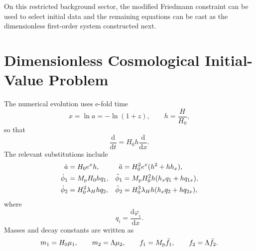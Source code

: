 \documentclass[aps,prd,twocolumn,superscriptaddress,nofootinbib,longbibliography]{revtex4-2}
\newcommand{\dd}{\mathrm{d}}
\newcommand{\Mp}{M_{\rm p}}
\newcommand{\Lam}{\Lambda}
\begin{document}
On this restricted background sector, the modified Friedmann constraint can be used to select initial data and the remaining equations can be cast as the dimensionless first-order system constructed next.

\section{Dimensionless Cosmological Initial-Value Problem}
\label{sec:ivp}

The numerical evolution uses e-fold time
\begin{equation}
x=\ln a=-\ln(1+z),
\qquad
h=\frac{H}{H_0},
\label{eq:xh}
\end{equation}
so that
\begin{equation}
\frac{\dd}{\dd t}=H_0h\frac{\dd}{\dd x}.
\label{eq:chain-rule}
\end{equation}
The relevant substitutions include
\begin{align}
\dot a&=H_0e^xh,
&
\ddot a&=H_0^2e^x(h^2+hh_x),\\
\dot\phi_1&=\Mp H_0h q_1,
&
\ddot\phi_1&=\Mp H_0^2h(h_xq_1+hq_{1x}),\\
\dot\phi_2&=H_0^2\lambda_H h q_2,
&
\ddot\phi_2&=H_0^3\lambda_H h(h_xq_2+hq_{2x}),
\label{eq:rescalings}
\end{align}
where
\begin{equation}
q_i=\frac{\dd\varphi_i}{\dd x}.
\end{equation}
Masses and decay constants are written as
\begin{equation}
m_1=H_0\mu_1,\qquad
m_2=\Lam\mu_2,\qquad
f_1=\Mp \bar f_1,\qquad
f_2=\Lam \bar f_2 .
\end{equation}
\end{document}
